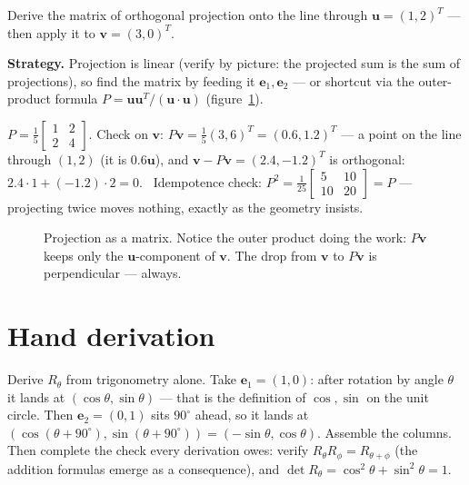 \begin{example}\label{ex:projmat}
Derive the matrix of orthogonal projection onto the line through
$\mathbf{u}=(1,2)^{T}$ --- then apply it to $\mathbf{v}=(3,0)^{T}$.
\par\smallskip
\textbf{Strategy.} Projection is linear (verify by picture: the
projected sum is the sum of projections), so find the matrix by feeding
it $\mathbf{e}_1,\mathbf{e}_2$ --- or shortcut via the outer-product
formula $P=\mathbf{u}\mathbf{u}^{T}/(\mathbf{u}\cdot\mathbf{u})$
(figure~\ref{fig:projection}).
\begin{solution}
$P=\frac{1}{5}\begin{bmatrix}1&2\\2&4\end{bmatrix}$. Check on
$\mathbf{v}$: $P\mathbf{v}=\tfrac15(3,6)^{T}=(0.6,1.2)^{T}$ --- a point
on the line through $(1,2)$ (it is $0.6\mathbf{u}$), and
$\mathbf{v}-P\mathbf{v}=(2.4,-1.2)^{T}$ is orthogonal:
$2.4\cdot1+(-1.2)\cdot2=0$. \checkmark\ Idempotence check:
$P^2=\frac1{25}\begin{bmatrix}5&10\\10&20\end{bmatrix}=P$ --- projecting
twice moves nothing, exactly as the geometry insists.
\end{solution}
\end{example}

\begin{figure}[htbp]\centering

\caption{Projection as a matrix. Notice the outer product doing the
work: $P\mathbf v$ keeps only the $\mathbf u$-component of $\mathbf v$.
The drop from $\mathbf v$ to $P\mathbf v$ is perpendicular --- always.}
\label{fig:projection}
\end{figure}

\section{Hand derivation}\label{sec:handderiv4}

Derive $R_\theta$ from trigonometry alone. Take $\mathbf e_1=(1,0)$: after rotation by angle $\theta$ it lands at $(\cos\theta,\sin\theta)$ — that is the definition of $\cos,\sin$ on the unit circle. Then $\mathbf e_2=(0,1)$ sits $90^\circ$ ahead, so it lands at $(\cos(\theta+90^\circ),\sin(\theta+90^\circ))=(-\sin\theta,\cos\theta)$. Assemble the columns. Then complete the check every derivation owes: verify $R_\theta R_\phi=R_{\theta+\phi}$ (the addition formulas emerge as a consequence), and $\det R_\theta=\cos^2\theta+\sin^2\theta=1$.

